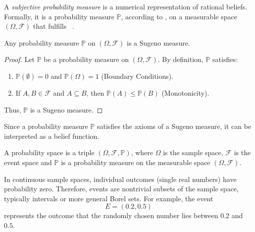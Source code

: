 \begin{definition}
	\label{def:subjective_probability}
	A \emph{subjective probability measure} is a numerical representation of rational beliefs. 
	Formally, it is a probability measure $\mathbb{P}$, according to , on a measurable space $(\Omega, \mathcal{F})$ that fulfills  ~\cite{shafer1987,hoff2009first}.
\end{definition}

\begin{theorem}
	Any probability measure $\mathbb{P}$ on $(\Omega, \mathcal{F})$ is a Sugeno measure.
\end{theorem}
\begin{proof}
	Let $\mathbb{P}$ be a probability measure on $(\Omega, \mathcal{F})$. By definition, $\mathbb{P}$ satisfies:
	\begin{enumerate}
		\item $\mathbb{P}(\emptyset) = 0$ and $\mathbb{P}(\Omega) = 1$ (Boundary Conditions).
		\item If $A, B \in \mathcal{F}$ and $A \subseteq B$, then $\mathbb{P}(A) \leq \mathbb{P}(B)$ (Monotonicity).
	\end{enumerate}
	Thus, $\mathbb{P}$ is a Sugeno measure.
\end{proof}

\begin{remark}
	Since a probability measure $\mathbb{P}$ satisfies the axioms of a Sugeno measure, it can be interpreted as a belief function.
\end{remark}





\begin{definition}
	\label{def:probability_space}
	A probability space is a triple $(\Omega, \mathcal{F}, \mathbb{P})$, where $\Omega$ is the sample space,	$\mathcal{F}$ is the event space and $\mathbb{P}$ is a probability measure on the measurable space $(\Omega, \mathcal{F})$.
\end{definition}

\begin{remark}
	In continuous sample spaces, individual outcomes (single real numbers) have probability zero. Therefore, events are nontrivial subsets of the sample space, typically intervals or more general Borel sets. For example, the event 
	\begin{equation}
		E = (0.2, 0.5)
	\end{equation} 
	represents the outcome that the randomly chosen number lies between $0.2$ and $0.5$.
\end{remark}

